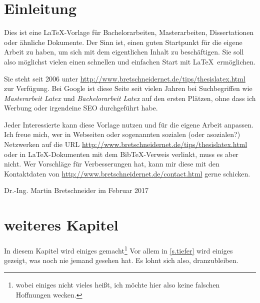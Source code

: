 \chapter{Einleitung}

Dies ist eine \LaTeX-Vorlage für Bachelorarbeiten, Masterarbeiten, Dissertationen oder ähnliche Dokumente. Der Sinn ist, einen guten Startpunkt für die eigene Arbeit zu haben, um sich mit dem eigentlichen Inhalt zu beschäftigen. Sie soll also möglichst vielen einen schnellen und einfachen Start mit \LaTeX\ ermöglichen.

Sie steht seit 2006 unter \url{http://www.bretschneidernet.de/tips/thesislatex.html} zur Verfügung.  Bei Google ist diese Seite seit vielen Jahren bei Suchbegriffen wie \textit{Masterarbeit Latex} und \textit{Bachelorarbeit Latex} auf den ersten Plätzen, ohne dass ich Werbung oder irgendeine SEO durchgeführt habe.

Jeder Interessierte kann diese Vorlage nutzen und für die eigene Arbeit anpassen. Ich freue mich, wer in Webseiten oder sogenannten sozialen (oder asozialen?) Netzwerken auf die URL \url{http://www.bretschneidernet.de/tips/thesislatex.html} oder in \LaTeX-Dokumenten mit dem BibTeX-Verweis\cite{thesislatex} verlinkt, muss es aber nicht. Wer Vorschläge für Verbesserungen hat, kann mir diese mit den Kontaktdaten von \url{http://www.bretschneidernet.de/contact.html} gerne schicken.

Dr.-Ing. Martin Bretschneider im Februar 2017





\chapter{weiteres Kapitel}\label{c.weitereskapitel}
In diesem Kapitel wird einiges gemacht\footnote{wobei einiges nicht vieles heißt, ich möchte hier also keine falschen Hoffnungen wecken.} Vor allem in \autoref{s.tiefer} wird einiges gezeigt, was noch nie jemand gesehen hat. Es lohnt sich also, dranzubleiben.

